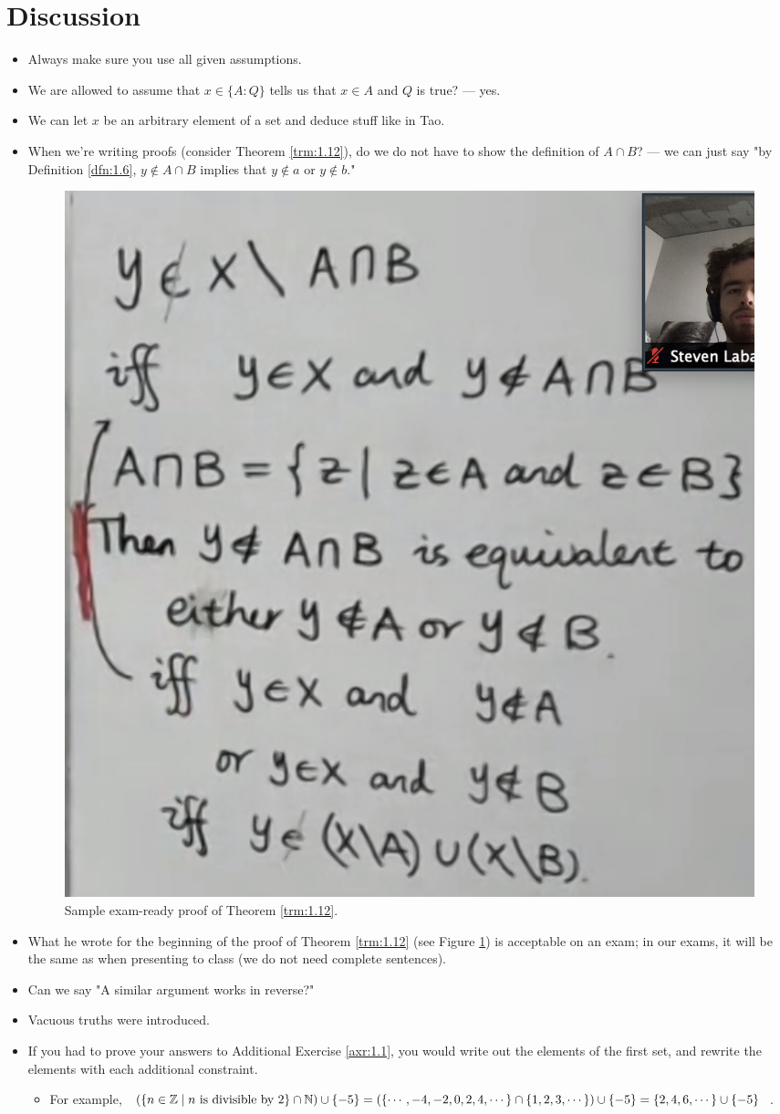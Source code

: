 \documentclass[titlepage]{report}
\begin{document}
\section{Discussion}
\begin{itemize}
    \item {}Always make sure you use all given assumptions.
    \item We are allowed to assume that $x\in\{A:Q\}$ tells us that $x\in A$ and $Q$ is true? --- yes.
    \item We can let $x$ be an arbitrary element of a set and deduce stuff like in Tao.
    \item When we're writing proofs (consider Theorem \ref{trm:1.12}), do we do not have to show the definition of $A\cap B$? --- we can just say "by Definition \ref{dfn:1.6}, $y\notin A\cap B$ implies that $y\notin a$ or $y\notin b$."
    \begin{figure}[h!]
        \centering
        \includegraphics[width=0.3\linewidth]{ExtFiles/SampleTrm1-12Proof.png}
        \caption{Sample exam-ready proof of Theorem \ref{trm:1.12}.}
        \label{fig:sampleTrm1-12Proof}
    \end{figure}
    \item What he wrote for the beginning of the proof of Theorem \ref{trm:1.12} (see Figure \ref{fig:sampleTrm1-12Proof}) is acceptable on an exam; in our exams, it will be the same as when presenting to class (we do not need complete sentences).
    \item Can we say "A similar argument works in reverse?"
    \item {}Vacuous truths were introduced.
    \item If you had to prove your answers to Additional Exercise \ref{axr:1.1}, you would write out the elements of the first set, and rewrite the elements with each additional constraint.
    \begin{itemize}
        \item For example, $(\{n\in\mathbb{Z}\mid n\text{ is divisible by }2\}\cap\mathbb{N})\cup\{-5\}=(\{\cdots,-4,-2,0,2,4,\cdots\}\cap\{1,2,3,\cdots\})\cup\{-5\}=\{2,4,6,\cdots\}\cup\{-5\}$.

\end{itemize}
\end{itemize}
\end{document}
